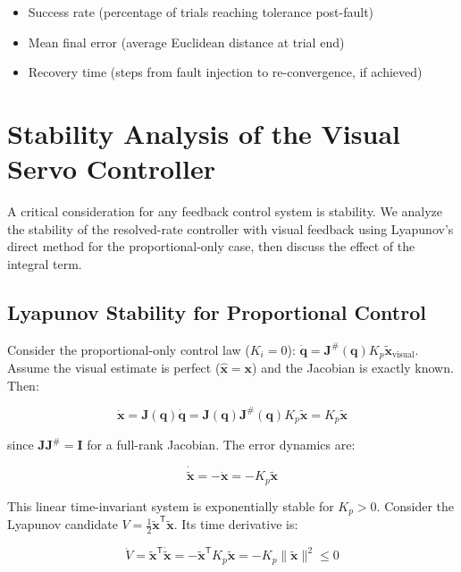 \documentclass[12pt,a4paper,oneside]{report}
\begin{document}
\begin{itemize}
    \item Success rate (percentage of trials reaching tolerance post-fault)
    \item Mean final error (average Euclidean distance at trial end)
    \item Recovery time (steps from fault injection to re-convergence, if achieved)
\end{itemize}

\section{Stability Analysis of the Visual Servo Controller}

A critical consideration for any feedback control system is stability. We analyze the stability of the resolved-rate controller with visual feedback using Lyapunov's direct method for the proportional-only case, then discuss the effect of the integral term.

\subsection{Lyapunov Stability for Proportional Control}

Consider the proportional-only control law ($K_i = 0$): $\dot{\mathbf{q}} = \mathbf{J}^{\#}(\mathbf{q}) K_p \tilde{\mathbf{x}}_{\text{visual}}$. Assume the visual estimate is perfect ($\hat{\mathbf{x}} = \mathbf{x}$) and the Jacobian is exactly known. Then:

\begin{equation}
\dot{\mathbf{x}} = \mathbf{J}(\mathbf{q}) \dot{\mathbf{q}} = \mathbf{J}(\mathbf{q}) \mathbf{J}^{\#}(\mathbf{q}) K_p \tilde{\mathbf{x}} = K_p \tilde{\mathbf{x}}
\end{equation}

since $\mathbf{J} \mathbf{J}^{\#} = \mathbf{I}$ for a full-rank Jacobian. The error dynamics are:

\begin{equation}
\dot{\tilde{\mathbf{x}}} = -\dot{\mathbf{x}} = -K_p \tilde{\mathbf{x}}
\end{equation}

This linear time-invariant system is exponentially stable for $K_p > 0$. Consider the Lyapunov candidate $V = \frac{1}{2} \tilde{\mathbf{x}}^{\mathsf{T}} \tilde{\mathbf{x}}$. Its time derivative is:

\begin{equation}
\dot{V} = \tilde{\mathbf{x}}^{\mathsf{T}} \dot{\tilde{\mathbf{x}}} = -\tilde{\mathbf{x}}^{\mathsf{T}} K_p \tilde{\mathbf{x}} = -K_p \|\tilde{\mathbf{x}}\|^2 \leq 0
\end{equation}
\end{document}
